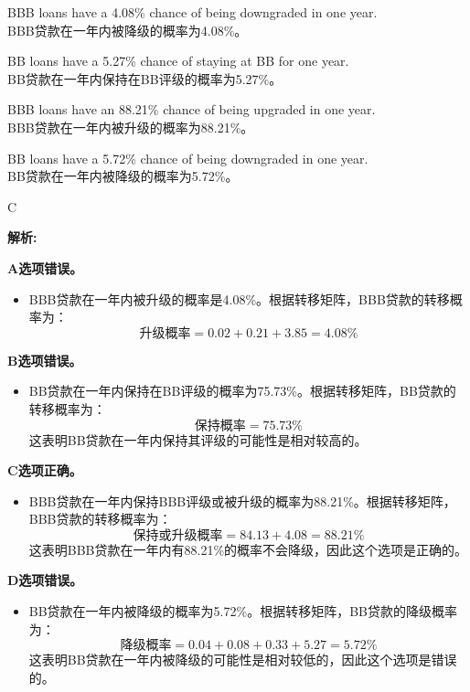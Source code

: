 \documentclass{article}
\newenvironment{explanation}
{\textbf{解析:}\par}
{\par}
\begin{document}
    \begin{choices}
        \item BBB loans have a 4.08\% chance of being downgraded in one year.\\
        BBB贷款在一年内被降级的概率为4.08\%。
        \item BB loans have a 5.27\% chance of staying at BB for one year.\\
        BB贷款在一年内保持在BB评级的概率为5.27\%。
        \item BBB loans have an 88.21\% chance of being upgraded in one year.\\
        BBB贷款在一年内被升级的概率为88.21\%。
        \item BB loans have a 5.72\% chance of being downgraded in one year.\\
        BB贷款在一年内被降级的概率为5.72\%。
    \end{choices}

\begin{correctanswer}
    C
\end{correctanswer}

\begin{explanation}
    \textbf{A选项错误。} 
    \begin{itemize}
        \item BBB贷款在一年内被升级的概率是4.08\%。根据转移矩阵，BBB贷款的转移概率为：
        \[
        \text{升级概率} = 0.02 + 0.21 + 3.85 = 4.08\%
        \]
    \end{itemize}

    \textbf{B选项错误。} 
    \begin{itemize}
        \item BB贷款在一年内保持在BB评级的概率为75.73\%。根据转移矩阵，BB贷款的转移概率为：
        \[
        \text{保持概率} = 75.73\%
        \]
        这表明BB贷款在一年内保持其评级的可能性是相对较高的。
    \end{itemize}

    \textbf{C选项正确。} 
    \begin{itemize}
        \item BBB贷款在一年内保持BBB评级或被升级的概率为88.21\%。根据转移矩阵，BBB贷款的转移概率为：
        \[
        \text{保持或升级概率} = 84.13 + 4.08 = 88.21\%
        \]
        这表明BBB贷款在一年内有88.21\%的概率不会降级，因此这个选项是正确的。
    \end{itemize}

    \textbf{D选项错误。} 
    \begin{itemize}
        \item BB贷款在一年内被降级的概率为5.72\%。根据转移矩阵，BB贷款的降级概率为：
        \[
        \text{降级概率} = 0.04 + 0.08 + 0.33 + 5.27 = 5.72\%
        \]
        这表明BB贷款在一年内被降级的可能性是相对较低的，因此这个选项是错误的。
    \end{itemize}
\end{explanation}
\end{document}
